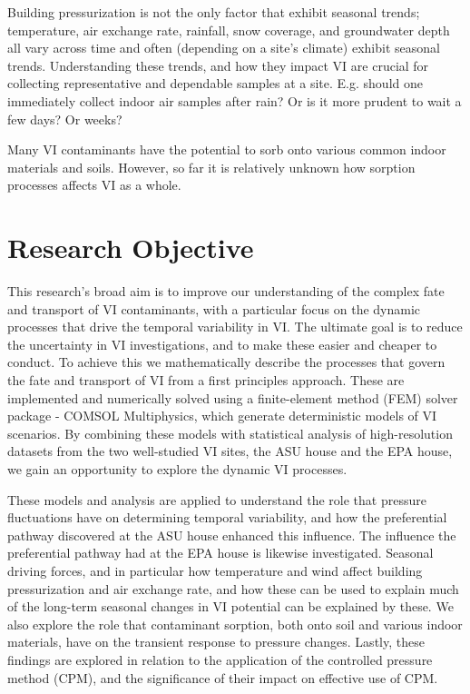 Building pressurization is not the only factor that exhibit seasonal trends; temperature, air exchange rate, rainfall, snow coverage, and groundwater depth all vary across time and often (depending on a site's climate) exhibit seasonal trends.
Understanding these trends, and how they impact VI are crucial for collecting representative and dependable samples at a site.
E.g. should one immediately collect indoor air samples after rain? Or is it more prudent to wait a few days? Or weeks? \par

Many VI contaminants have the potential to sorb onto various common indoor materials and soils.
However, so far it is relatively unknown how sorption processes affects VI as a whole.


\section{Research Objective}

This research's broad aim is to improve our understanding of the complex fate and transport of VI contaminants, with a particular focus on the dynamic processes that drive the temporal variability in VI.
The ultimate goal is to reduce the uncertainty in VI investigations, and to make these easier and cheaper to conduct.
To achieve this we mathematically describe the processes that govern the fate and transport of VI from a first principles approach.
These are implemented and numerically solved using a finite-element method (FEM) solver package - COMSOL Multiphysics, which generate deterministic models of VI scenarios.
By combining these models with statistical analysis of high-resolution datasets from the two well-studied VI sites, the ASU house and the EPA house, we gain an opportunity to explore the dynamic VI processes.\par

These models and analysis are applied to understand the role that pressure fluctuations have on determining temporal variability, and how the preferential pathway discovered at the ASU house enhanced this influence.
The influence the preferential pathway had at the EPA house is likewise investigated.
Seasonal driving forces, and in particular how temperature and wind affect building pressurization and air exchange rate, and how these can be used to explain much of the long-term seasonal changes in VI potential can be explained by these.
We also explore the role that contaminant sorption, both onto soil and various indoor materials, have on the transient response to pressure changes.
Lastly, these findings are explored in relation to the application of the controlled pressure method (CPM), and the significance of their impact on effective use of CPM.\par
